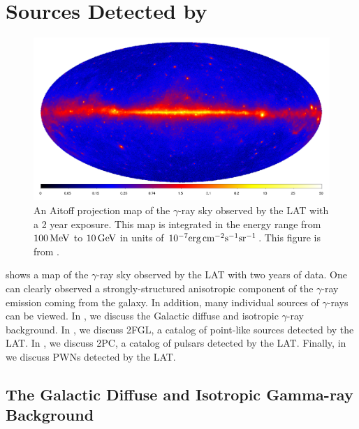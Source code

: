 
\section{Sources Detected by }

\begin{figure}[htbp]
  \centering
    \includegraphics[width=\textwidth]{chapters/introduction/figures/lat_skymap_2fgl.pdf}
  \caption{
  An Aitoff projection map of the $\gamma$-ray sky observed by the
  \ac{LAT} with a 2 year exposure.  This map is integrated in the
  energy range from $100\,\text{MeV}$ to $10\,\text{GeV}$ in units
  of $10^{-7}\text{erg}\,\text{cm}^{-2}\text{s}^{-1}\text{sr}^{-1}$.  This figure is
  from \cite{nolan_2012_fermi-large}.
  }
\end{figure}

 shows a map of the $\gamma$-ray sky observed
by the \ac{LAT} with two years of data. One can clearly observed a
strongly-structured anisotropic component of the $\gamma$-ray emission
coming from the galaxy. In addition, many individual sources of $\gamma$-rays
can be viewed. In , we
discuss the Galactic diffuse and isotropic $\gamma$-ray background. In
, we discuss \ac{2FGL}, a catalog of point-like
sources detected by the \ac{LAT}. In \subsecref{2pc}, we discuss
\ac{2PC}, a catalog of pulsars detected by the \ac{LAT}.  Finally,
in  we discuss \acp{PWN} detected by the
\ac{LAT}.


\subsection{The Galactic Diffuse and Isotropic Gamma-ray Background}

